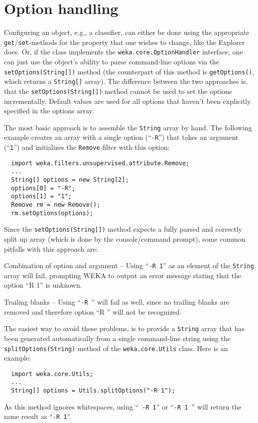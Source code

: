 \newpage

\section{Option handling}
\label{api_optionhandling}
Configuring an object, e.g., a classifier, can either be done using the
appropriate \texttt{get}/\texttt{set}-methods for the property that one wishes
to change, like the Explorer does. Or, if the class implements the
\texttt{weka.core.OptionHandler} interface, one can just use the object's
ability to parse command-line options via the \texttt{setOptions(String[])}
method (the counterpart of this method is \texttt{getOptions()}, which returns a
\texttt{String[]} array). The difference between the two approaches is, that the
\texttt{setOptions(String[])} method cannot be used to set the options
incrementally. Default values are used for all options that haven't been
explicitly specified in the options array.

The most basic approach is to assemble the \texttt{String} array by hand. The
following example creates an array with a single option (``\texttt{-R}'') that
takes an argument (``\texttt{1}'') and initializes the \texttt{Remove} filter
with this option:
\begin{verbatim}
  import weka.filters.unsupervised.attribute.Remove;
  ...
  String[] options = new String[2];
  options[0] = "-R";
  options[1] = "1";
  Remove rm = new Remove();
  rm.setOptions(options);
\end{verbatim}
Since the \texttt{setOptions(String[])} method expects a fully parsed and
correctly split up array (which is done by the console/command prompt), some
common pitfalls with this approach are:
\begin{tight_itemize}
	\item Combination of option and argument -- Using ``\texttt{-R 1}'' as an
element of the \texttt{String} array will fail, prompting WEKA to output an
error message stating that the option ``R 1'' is unknown.
	\item Trailing blanks -- Using ``\texttt{-R }'' will fail as well, since no
trailing blanks are removed and therefore option ``R '' will not be recognized.
\end{tight_itemize}
The easiest way to avoid these problems, is to provide a \texttt{String} array
that has been generated automatically from a single command-line string using
the \texttt{splitOptions(String)} method of the \texttt{weka.core.Utils} class.
Here is an example:
\begin{verbatim}
  import weka.core.Utils;
  ...
  String[] options = Utils.splitOptions("-R 1");
\end{verbatim}
As this method ignores whitespaces, using ``\texttt{  -R    1}'' or
``\texttt{-R 1 }'' will return the same result as ``\texttt{-R 1}''.

